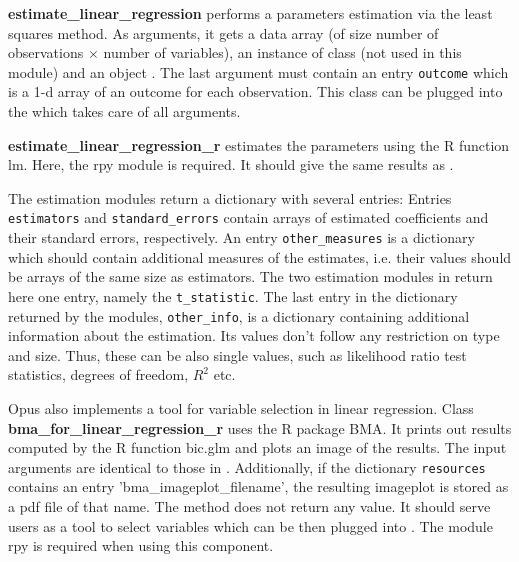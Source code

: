 {\bf estimate_linear_regression} 
performs a parameters estimation via the
least squares method. As arguments, it gets a data array (of size number of observations
$\times$ number of variables), an instance of class  (not
used in this module) and an object . The last
argument must contain an entry \verb|outcome| which is a 1-d array of an outcome
for each observation. This class can be plugged into the
 which takes care of all arguments.

{\bf estimate_linear_regression_r} 
estimates the parameters using the R function lm. Here, the rpy module is required. It should 
give the same results as .

The estimation modules return a dictionary with several entries: Entries \verb|estimators| and
\verb|standard_errors| contain arrays of estimated coefficients and their
standard errors, respectively. An entry \verb|other_measures| is a dictionary
which should contain additional measures of the estimates, i.e. their values
should be arrays of the same size as estimators. The two estimation modules
in  return here one entry, namely the \verb|t_statistic|. The last entry in
the dictionary returned by the modules, \verb|other_info|, is a dictionary
containing additional information about the estimation. Its values don't
follow any restriction on type and size. Thus, these can be also single values,
such as likelihood ratio test statistics, degrees of freedom, $R^2$ etc.

Opus also implements a tool for variable selection in linear regression. Class 
{\bf bma_for_linear_regression_r} uses the R package BMA. 
It prints out results computed by the R function bic.glm and plots an image of the results.
The input arguments are identical to those in . Additionally,
if the dictionary \verb|resources| contains an entry 'bma_imageplot_filename', the resulting imageplot 
is stored as a pdf file of that name. 
The  method does not return any value. It should serve users as a tool to select variables 
which can be then plugged into . The module rpy is required 
when using this component.

